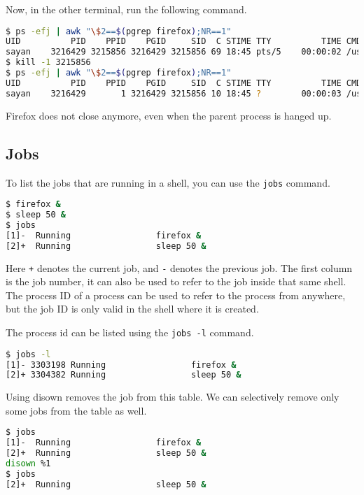 Now, in the other terminal, run the following command.

\begin{lstlisting}[language=bash]
$ ps -efj | awk "\$2==$(pgrep firefox);NR==1"
UID          PID    PPID    PGID     SID  C STIME TTY          TIME CMD
sayan    3216429 3215856 3216429 3215856 69 18:45 pts/5    00:00:02 /usr/lib/firefox/firefox
$ kill -1 3215856
$ ps -efj | awk "\$2==$(pgrep firefox);NR==1"
UID          PID    PPID    PGID     SID  C STIME TTY          TIME CMD
sayan    3216429       1 3216429 3215856 10 18:45 ?        00:00:03 /usr/lib/firefox/firefox
\end{lstlisting}

Firefox does not close anymore, even when the parent process is hanged up.

\subsection{Jobs}

To list the jobs that are running in a shell, you can use the \lstinline|jobs| command.

\begin{lstlisting}[language=bash]
$ firefox &
$ sleep 50 &
$ jobs
[1]-  Running                 firefox &
[2]+  Running                 sleep 50 &
\end{lstlisting}

Here \lstinline|+| denotes the current job, and \lstinline|-| denotes the previous job.
The first column is the job number, it can also be used to refer to the job
inside that same shell. The process ID of a process can be used to refer to
the process from anywhere, but the job ID is only valid in the shell where
it is created.

The process id can be listed using the \lstinline|jobs -l| command.

\begin{lstlisting}[language=bash]
$ jobs -l
[1]- 3303198 Running                 firefox &
[2]+ 3304382 Running                 sleep 50 &
\end{lstlisting}

Using disown removes the job from this table. We can selectively
remove only some jobs from the table as well.

\begin{lstlisting}[language=bash]
$ jobs
[1]-  Running                 firefox &
[2]+  Running                 sleep 50 &
disown %1
$ jobs
[2]+  Running                 sleep 50 &
\end{lstlisting}

